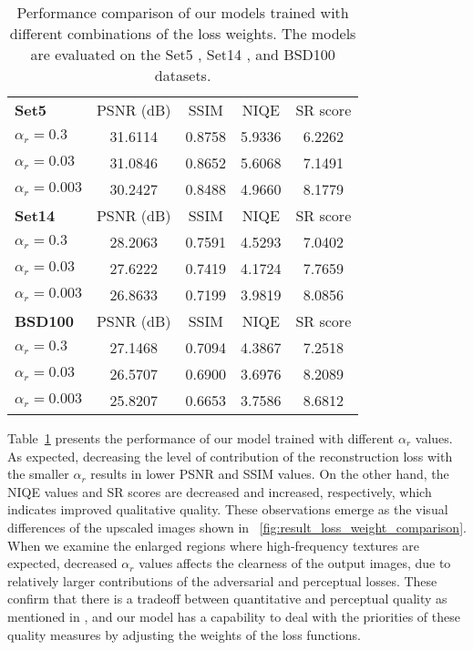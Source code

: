 \documentclass[runningheads]{llncs}
\begin{document}
\begin{table}[t]
	\scriptsize
	\centering
	\caption{Performance comparison of our models trained with different combinations of the loss weights. The models are evaluated on the Set5 \cite{bevilacqua2012low}, Set14 \cite{zeyde2010single}, and BSD100 \cite{martin2001database} datasets.}
	\label{table:result_loss_weight_comparison}
	\begin{tabular}{lcccc}
		\\
		\textbf{Set5} & PSNR (dB) & SSIM & NIQE & SR score \\
		\noalign{\smallskip}
		\hline
		\noalign{\smallskip}
		${\alpha}_{r} = 0.3$ & 31.6114 & 0.8758 & 5.9336 & 6.2262 \\
		${\alpha}_{r} = 0.03$ & 31.0846 & 0.8652 & 5.6068 & 7.1491 \\
		${\alpha}_{r} = 0.003$ & 30.2427 & 0.8488 & 4.9660 & 8.1779 \\
		\noalign{\smallskip}
		\noalign{\smallskip}
		\textbf{Set14} & PSNR (dB) & SSIM & NIQE & SR score \\
		\noalign{\smallskip}
		\hline
		\noalign{\smallskip}
		${\alpha}_{r} = 0.3$ & 28.2063 & 0.7591 & 4.5293 & 7.0402 \\
		${\alpha}_{r} = 0.03$ & 27.6222 & 0.7419 & 4.1724 & 7.7659 \\
		${\alpha}_{r} = 0.003$ & 26.8633 & 0.7199 & 3.9819 & 8.0856 \\
		\noalign{\smallskip}
		\noalign{\smallskip}
		\textbf{BSD100} & PSNR (dB) & SSIM & NIQE & SR score \\
		\noalign{\smallskip}
		\hline
		\noalign{\smallskip}
		${\alpha}_{r} = 0.3$ & 27.1468 & 0.7094 & 4.3867 & 7.2518 \\
		${\alpha}_{r} = 0.03$ & 26.5707 & 0.6900 & 3.6976 & 8.2089 \\
		${\alpha}_{r} = 0.003$ & 25.8207 & 0.6653 & 3.7586 & 8.6812
	\end{tabular}
\end{table}

Table~\ref{table:result_loss_weight_comparison} presents the performance of our model trained with different ${\alpha}_{r}$ values.
As expected, decreasing the level of contribution of the reconstruction loss with the smaller ${\alpha}_{r}$ results in lower PSNR and SSIM values.
On the other hand, the NIQE values and SR scores are decreased and increased, respectively, which indicates improved qualitative quality.
These observations emerge as the visual differences of the upscaled images shown in \figurename~\ref{fig:result_loss_weight_comparison}.
When we examine the enlarged regions where high-frequency textures are expected, decreased ${\alpha}_{r}$ values affects the clearness of the output images, due to relatively larger contributions of the adversarial and perceptual losses.
These confirm that there is a tradeoff between quantitative and perceptual quality as mentioned in \cite{blau2017perception}, and our model has a capability to deal with the priorities of these quality measures by adjusting the weights of the loss functions.
\end{document}
